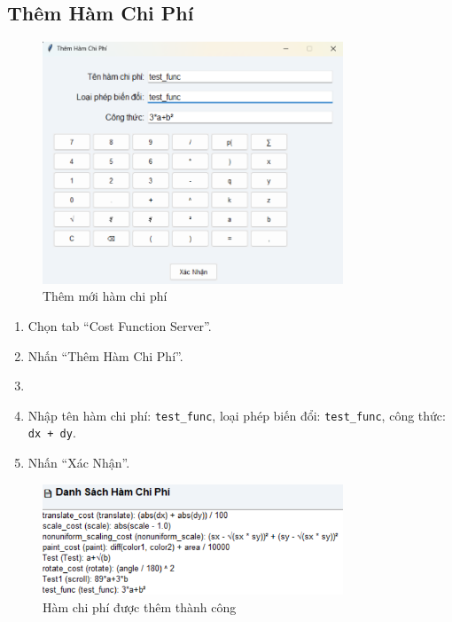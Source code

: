 \documentclass[a4paper,12pt]{article}
\begin{document}
\subsection{Thêm Hàm Chi Phí}
\begin{figure}[H]
    \centering
    \includegraphics[width=0.8\textwidth]{addCost.png}
    \caption{Thêm mới hàm chi phí}
    \label{fig:tlm_tab}
    \end{figure}
\begin{enumerate}
    \item Chọn tab “Cost Function Server”.
    \item Nhấn “Thêm Hàm Chi Phí”.
    \item 
    \item Nhập tên hàm chi phí: \texttt{test\_func}, loại phép biến đổi: \texttt{test\_func}, công thức: \texttt{dx + dy}.
    \item Nhấn “Xác Nhận”.
\end{enumerate}
\begin{figure}[H]
    \centering
    \includegraphics[width=0.8\textwidth]{afterAddCost.png}
    \caption{Hàm chi phí được thêm thành công}
    \label{fig:tlm_tab}
    \end{figure}
\end{document}
